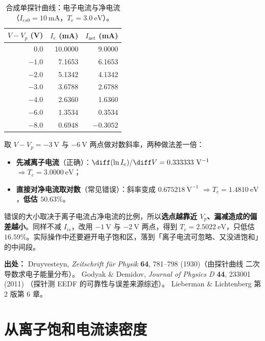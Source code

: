 \begin{table}[htbp]
  \centering
  \caption{合成单探针曲线：电子电流与净电流（$I_{es0}=10\ \mathrm{mA}$，$T_e=3.0\ \mathrm{eV}$）。}
  \label{tab:app-q-iv}
  \begin{tabular}{@{}rrr@{}}
    \toprule
    $V-V_p$ (V) & $I_e$ (mA) & $I_{\mathrm{net}}$ (mA) \\
    \midrule
    0.0 & 10.0000 & 9.0000 \\
    $-1.0$ & 7.1653 & 6.1653 \\
    $-2.0$ & 5.1342 & 4.1342 \\
    $-3.0$ & 3.6788 & 2.6788 \\
    $-4.0$ & 2.6360 & 1.6360 \\
    $-6.0$ & 1.3534 & 0.3534 \\
    $-8.0$ & 0.6948 & $-0.3052$ \\
    \bottomrule
  \end{tabular}
\end{table}

取 $V-V_p=-3\ \mathrm{V}$ 与 $-6\ \mathrm{V}$ 两点做对数斜率，两种做法差一倍：

\begin{itemize}
  \item \textbf{先减离子电流}（正确）：$\diff(\ln I_e)/\diff V = 0.333333\ \mathrm{V^{-1}}$
        $\Rightarrow T_e=3.0000\ \mathrm{eV}$；
  \item \textbf{直接对净电流取对数}（常见错误）：斜率变成 $0.675218\ \mathrm{V^{-1}}$
        $\Rightarrow T_e=1.4810\ \mathrm{eV}$，\textbf{低估 $50.63\%$}。
\end{itemize}

错误的大小取决于离子电流占净电流的比例，所以\textbf{选点越靠近 $V_p$、漏减造成的偏差越小}。同样不减 $I_{is}$，改用 $-1\ \mathrm{V}$ 与 $-2\ \mathrm{V}$ 两点，得到 $T_e=2.5022\ \mathrm{eV}$，只低估 $16.59\%$。实际操作中还要避开电子饱和区，落到「离子电流可忽略、又没进饱和」的中间段。

{\footnotesize
\textbf{出处：} Druyvesteyn, \emph{Zeitschrift f\"ur Physik} \textbf{64}, 781--798 (1930)（由探针曲线
二次导数求电子能量分布）。
Godyak \& Demidov, \emph{Journal of Physics D} \textbf{44}, 233001 (2011)
（探针测 EEDF 的可靠性与误差来源综述）。
Lieberman \& Lichtenberg 第 2 版第 6 章。
}

\section{从离子饱和电流读密度}
\label{sec:app-q-ne}

